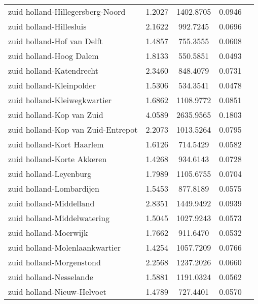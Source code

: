\begin{longtable}{llccc}
	zuid holland-Hillegersberg-Noord          & 1.2027  & 1402.8705 & 0.0946                 \\
	zuid holland-Hillesluis                   & 2.1622  & 992.7245  & 0.0696                 \\
	zuid holland-Hof van Delft                & 1.4857  & 755.3555  & 0.0608                 \\
	zuid holland-Hoog Dalem                   & 1.8133  & 550.5851  & 0.0493                 \\
	zuid holland-Katendrecht                  & 2.3460  & 848.4079  & 0.0731                 \\
	zuid holland-Kleinpolder                  & 1.5306  & 534.3541  & 0.0478                 \\
	zuid holland-Kleiwegkwartier              & 1.6862  & 1108.9772 & 0.0851                 \\
	zuid holland-Kop van Zuid                 & 4.0589  & 2635.9565 & 0.1803                 \\
	zuid holland-Kop van Zuid-Entrepot        & 2.2073  & 1013.5264 & 0.0795                 \\
	zuid holland-Kort Haarlem                 & 1.6126  & 714.5429  & 0.0582                 \\
	zuid holland-Korte Akkeren                & 1.4268  & 934.6143  & 0.0728                 \\
	zuid holland-Leyenburg                    & 1.7989  & 1105.6755 & 0.0704                 \\
	zuid holland-Lombardijen                  & 1.5453  & 877.8189  & 0.0575                 \\
	zuid holland-Middelland                   & 2.8351  & 1449.9492 & 0.0939                 \\
	zuid holland-Middelwatering               & 1.5045  & 1027.9243 & 0.0573                 \\
	zuid holland-Moerwijk                     & 1.7662  & 911.6470  & 0.0532                 \\
	zuid holland-Molenlaankwartier            & 1.4254  & 1057.7209 & 0.0766                 \\
	zuid holland-Morgenstond                  & 2.2568  & 1237.2026 & 0.0660                 \\
	zuid holland-Nesselande                   & 1.5881  & 1191.0324 & 0.0562                 \\
	zuid holland-Nieuw-Helvoet                & 1.4789  & 727.4401  & 0.0570                 \\

\end{longtable}
